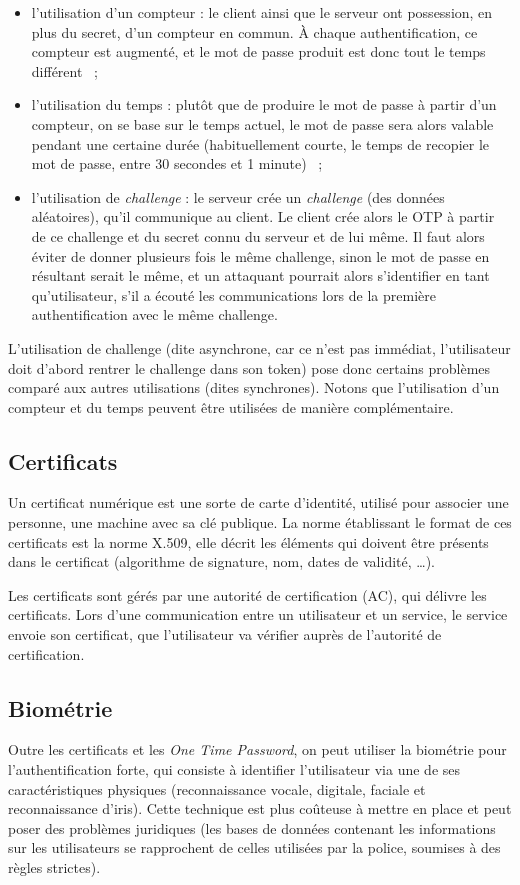\begin{itemize}
  \item l'utilisation d'un compteur : le client ainsi que le
serveur ont possession, en plus du secret, d'un compteur en
commun. À chaque authentification, ce compteur est augmenté, et le
mot de passe produit est donc tout le temps différent ~;
  \item l'utilisation du temps : plutôt que de produire le mot de
passe à partir d'un compteur, on se base sur le temps actuel, le
mot de passe sera alors valable pendant une certaine durée
(habituellement courte, le temps de recopier le mot de passe, 
 entre 30 secondes et 1 minute) ~;
  \item l'utilisation de \emph{challenge} : le serveur crée un
\emph{challenge} (des données aléatoires), qu'il communique au
client. Le client crée alors le OTP à partir de ce challenge et du
secret connu du serveur et de lui même. Il faut alors éviter de
donner plusieurs fois le même challenge, sinon le mot de passe en
résultant serait le même, et un attaquant pourrait alors
s'identifier en tant qu'utilisateur, s'il a écouté les
communications lors de la première authentification avec le même
challenge. 
\\
\end{itemize}

L'utilisation de challenge (dite asynchrone, car ce n'est pas
immédiat, l'utilisateur doit d'abord rentrer le challenge dans 
son token) pose donc certains problèmes comparé aux autres 
utilisations (dites synchrones). Notons que 
l'utilisation d'un compteur et du temps peuvent être utilisées de
manière complémentaire.


\subsection{Certificats}
Un certificat numérique est une sorte de carte d'identité,
utilisé pour associer une personne, une machine avec sa clé
publique.
La norme établissant le format de ces certificats est la norme
X.509, elle décrit les éléments qui doivent être présents dans le
certificat (algorithme de signature, nom, dates de validité, …).

Les certificats sont gérés par une autorité de certification (AC),
qui délivre les certificats.
Lors d'une communication entre un utilisateur et un service,
le service envoie son certificat, que l'utilisateur va vérifier
auprès de l'autorité de certification.


\subsection{Biométrie}
Outre les certificats et les \emph{One Time Password}, on peut
utiliser la biométrie pour l'authentification forte, qui consiste
à identifier l'utilisateur via une de ses caractéristiques
physiques (reconnaissance vocale, digitale, faciale et
reconnaissance d'iris).
Cette technique est plus coûteuse à mettre en place et peut poser
des problèmes juridiques (les bases de données contenant les
informations sur les utilisateurs se rapprochent de celles
utilisées par la police, soumises à des règles strictes).
